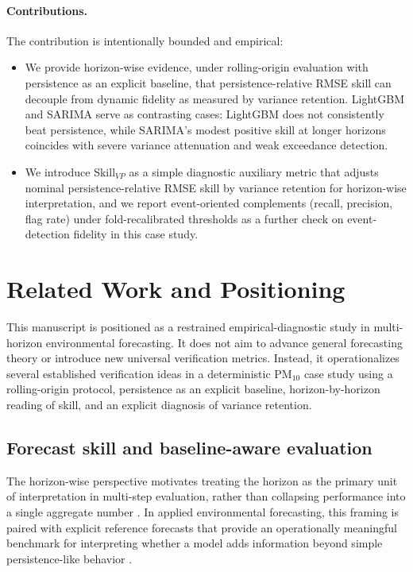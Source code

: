 \documentclass{article}
\begin{document}
\paragraph{Contributions.}
The contribution is intentionally bounded and empirical:
\begin{itemize}
  \item We provide horizon-wise evidence, under rolling-origin evaluation with
    persistence as an explicit baseline, that persistence-relative RMSE skill
    can decouple from dynamic fidelity as measured by variance retention.
    LightGBM and SARIMA serve as contrasting cases: LightGBM does not
    consistently beat persistence, while SARIMA's modest positive skill at
    longer horizons coincides with severe variance attenuation and weak
    exceedance detection.
  \item We introduce Skill$_{VP}$ as a simple diagnostic auxiliary metric that
    adjusts nominal persistence-relative RMSE skill by variance retention for
    horizon-wise interpretation, and we report event-oriented complements
    (recall, precision, flag rate) under fold-recalibrated thresholds as a
    further check on event-detection fidelity in this case study.
\end{itemize}

\section{Related Work and Positioning}

This manuscript is positioned as a restrained empirical-diagnostic study in
multi-horizon environmental forecasting.
It does not aim to advance general forecasting theory or introduce new universal
verification metrics.
Instead, it operationalizes several established verification ideas in a
deterministic PM$_{10}$ case study using a rolling-origin protocol,
persistence as an explicit baseline, horizon-by-horizon reading of skill, and
an explicit diagnosis of variance retention.

\subsection{Forecast skill and baseline-aware evaluation}

The horizon-wise perspective motivates treating the horizon as the primary unit
of interpretation in multi-step evaluation, rather than collapsing performance
into a single aggregate number \citep{bentaieb2012}.
In applied environmental forecasting, this framing is paired with explicit
reference forecasts that provide an operationally meaningful benchmark for
interpreting whether a model adds information beyond simple persistence-like
behavior \citep{murphy1992}.
\end{document}
